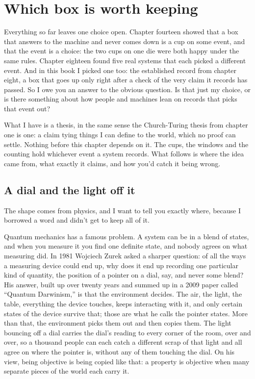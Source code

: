 \documentclass[11pt,twoside]{article}
\theoremstyle{thielethm}
\theoremstyle{thieledef}
\theoremstyle{thieledef}
\theoremstyle{thieledef}
\theoremstyle{thielethm}
\theoremstyle{thieleobs}
\theoremstyle{thielethm}
\begin{document}
\section{Which box is worth keeping}
\label{sec:worth-keeping}

Everything so far leaves one choice open. Chapter fourteen showed that a box that answers to the machine and never comes down is a cup on some event, and that the event is a choice: the two cups on one die were both happy under the same rules. Chapter eighteen found five real systems that each picked a different event. And in this book I picked one too: the established record from chapter eight, a box that goes up only right after a check of the very claim it records has passed. So I owe you an answer to the obvious question. Is that just my choice, or is there something about how people and machines lean on records that picks that event out?

What I have is a thesis, in the same sense the Church-Turing thesis from chapter one is one: a claim tying things I can define to the world, which no proof can settle. Nothing before this chapter depends on it. The cups, the windows and the counting hold whichever event a system records. What follows is where the idea came from, what exactly it claims, and how you'd catch it being wrong.

\subsection{A dial and the light off it}

The shape comes from physics, and I want to tell you exactly where, because I borrowed a word and didn't get to keep all of it.

Quantum mechanics has a famous problem. A system can be in a blend of states, and when you measure it you find one definite state, and nobody agrees on what measuring did. In 1981 Wojciech Zurek asked a sharper question: of all the ways a measuring device could end up, why does it end up recording one particular kind of quantity, the position of a pointer on a dial, say, and never some blend? His answer, built up over twenty years and summed up in a 2009 paper called ``Quantum Darwinism,'' is that the environment decides. The air, the light, the table, everything the device touches, keeps interacting with it, and only certain states of the device survive that; those are what he calls the pointer states. More than that, the environment picks them out and then copies them. The light bouncing off a dial carries the dial's reading to every corner of the room, over and over, so a thousand people can each catch a different scrap of that light and all agree on where the pointer is, without any of them touching the dial. On his view, being objective is being copied like that: a property is objective when many separate pieces of the world each carry it.
\end{document}
